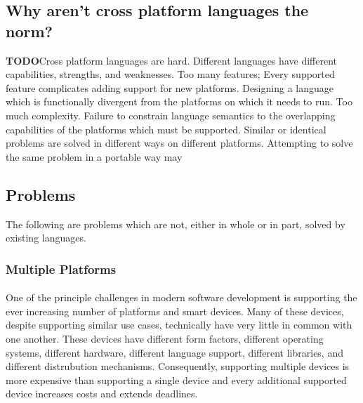 \documentclass[hidelinks]{article}
\begin{document}
\subsection{Why aren't cross platform languages the norm?}
\textbf{TODO}Cross platform languages are hard. Different languages have different capabilities, strengths, and weaknesses. Too many features; Every supported feature complicates adding support for new platforms. Designing a language which is functionally divergent from the platforms on which it needs to run. Too much complexity. Failure to constrain language semantics to the overlapping capabilities of the platforms which must be supported. Similar or identical problems are solved in different ways on different platforms. Attempting to solve the same problem in a portable way may 
\subsection{Problems}
The following are problems which are not, either in whole or in part, solved by existing languages.
\subsubsection{Multiple Platforms}\paragraph{}One of the principle challenges in modern software development is supporting the ever increasing number of platforms and smart devices. Many of these devices, despite supporting similar use cases, technically have very little in common with one another. These devices have different form factors, different operating systems, different hardware, different language support, different libraries, and different distrubution mechanisms. Consequently, supporting multiple devices is more expensive than supporting a single device and every additional supported device increases costs and extends deadlines.
\end{document}
